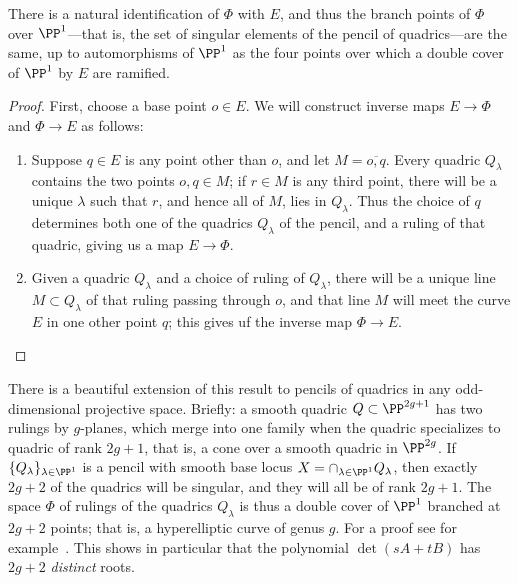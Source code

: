 \begin{proposition}\label{rulings on pencil}
There is a natural identification of $\Phi$ with $E$, and thus the branch points of $\Phi$ over $\PP^1$---that is, the set of singular elements of the pencil of quadrics---are the same, up to automorphisms of $\PP^1$ as the four points over which a double cover of $\PP^1$ by $E$ are ramified.
\end{proposition} 


\begin{proof}
First, choose a base point $o \in E$. We will construct inverse maps $E \to \Phi$ and $\Phi \to E$ as follows:
\begin{enumerate}

\item Suppose $q \in E$ is any point other than $o$, and let $M = \overline{o,q}$. Every quadric $Q_\lambda$ contains the two points $o, q \in M$; if $r \in M$ is any third point, there will be a unique $\lambda$ such that $r$, and hence all of $M$, lies in $Q_\lambda$. Thus the choice of $q$ determines both one of the quadrics $Q_\lambda$ of the pencil, and a ruling of that quadric, giving us a map $E \to \Phi$.

\item  Given a quadric $Q_\lambda$ and a choice of ruling of $Q_\lambda$, there will be a unique line $M \subset Q_\lambda$ of that ruling passing through $o$, and that line $M$ will meet the curve $E$ in one other point $q$; this gives uf the inverse map $\Phi \to E$.
\end{enumerate}
\end{proof}

\begin{fact}
 There is a beautiful extension of this result to pencils of quadrics in any odd-dimensional projective space. Briefly: a smooth quadric $Q \subset \PP^{2g+1}$ has two rulings by $g$-planes, which merge into one family when the quadric specializes to quadric of rank $2g+1$, that is, a cone over a smooth quadric in $\PP^{2g}$. If $\{Q_\lambda\}_{\lambda \in \PP^1}$ is a pencil with smooth base locus $X = \cap_{\lambda \in \PP^1} Q_\lambda$, then exactly $2g+2$ of the quadrics will be singular, and they will all be of rank $2g+1$. The space $\Phi$ of rulings of the quadrics $Q_\lambda$ is thus a double cover of $\PP^1$ branched at $2g+2$  points; that is, a hyperelliptic curve of genus $g$. For a proof see for example~\cite[Proposition 22.34]{Harris1995}.
 This shows in particular that the polynomial $\det(sA+tB)$ has $2g+2$ \emph{distinct} roots. 
\end{fact}

